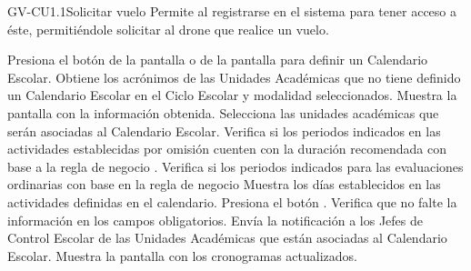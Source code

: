 \begin{UseCase}{GV-CU1.1}{Solicitar vuelo}{
		Permite al  registrarse en el sistema para tener acceso a éste, permitiéndole solicitar al drone que realice un vuelo.
	}
{\begin{Titemize}
			\Titem {}
		\end{Titemize}				
	}
\end{UseCase}



\begin{UCtrayectoria}
	\UCpaso [\UCactor] Presiona el botón  de la pantalla  o de la pantalla  para definir un Calendario Escolar.
	\UCpaso Obtiene los acrónimos de las Unidades Académicas que no tiene definido un Calendario Escolar en el Ciclo Escolar y modalidad seleccionados. 	
	\UCpaso Muestra la pantalla  con la información obtenida.
	\UCpaso [\UCactor] Selecciona las unidades académicas que serán asociadas al Calendario Escolar.    
	\UCpaso Verifica si los periodos indicados en las actividades establecidas por omisión cuenten con la duración recomendada con base a la regla de negocio . 
	\UCpaso Verifica si los periodos indicados para las evaluaciones ordinarias con base en la regla de negocio     
	\UCpaso \label{IN-DAE-CU2.1:dia}Muestra los días establecidos en las actividades definidas en el calendario.
	\UCpaso [\UCactor] Presiona el botón . 
	\UCpaso Verifica que no falte la información en los  campos obligatorios. 
	\UCpaso Envía la notificación a los Jefes de Control Escolar de las Unidades Académicas que están asociadas al Calendario Escolar.
	\UCpaso Muestra la pantalla  con los cronogramas actualizados.
\end{UCtrayectoria}


